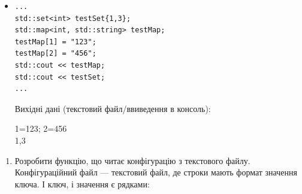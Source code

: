 \documentclass[]{article}
\begin{document}
\begin{itemize}
\item
\begin{verbatim}
...
std::set<int> testSet{1,3};
std::map<int, std::string> testMap;
testMap[1] = "123";
testMap[2] = "456";
std::cout << testMap;
std::cout << testSet;
...
\end{verbatim}

  Вихідні дані (текстовий файл/ввиведення в консоль):

  1=123; 2=456\\
  1,3
\end{itemize}

\begin{enumerate}
\def\labelenumi{\arabic{enumi}.}
\item
  Розробити функцію, що читає конфігурацію з текстового файлу.
  Конфігураційний файл --- текстовий файл, де строки мають формат
  значення ключа. І ключ, і значення є рядками:
\end{enumerate}
\end{document}
